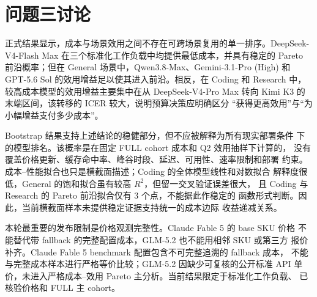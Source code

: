 \section{问题三讨论}

正式结果显示，成本与场景效用之间不存在可跨场景复用的单一排序。DeepSeek-
V4-Flash Max 在三个标准化工作负载中均提供最低成本，并具有稳定的
Pareto 前沿概率；但在 General 场景中，Qwen3.8-Max、Gemini-3.1-Pro
(High) 和 GPT-5.6 Sol 的效用增益足以使其进入前沿。相反，在 Coding 和
Research 中，较高成本模型的效用增益主要集中在从 DeepSeek-V4-Pro Max
转向 Kimi K3 的末端区间，该转移的 ICER 较大，说明预算决策应明确区分
“获得更高效用”与“为小幅增益支付多少成本”。

Bootstrap 结果支持上述结论的稳健部分，但不应被解释为所有现实部署条件
下的模型排名。该概率是在固定 FULL cohort 成本和 Q2 效用抽样下计算的，
没有覆盖价格更新、缓存命中率、峰谷时段、延迟、可用性、速率限制和部署
约束。成本--性能拟合也只是横截面描述；Coding 的全体模型线性和对数拟合
解释度很低，General 的饱和拟合虽有较高 $R^2$，但留一交叉验证误差很大，
且 Coding 与 Research 的 Pareto 前沿拟合仅有 3 个点，不能据此作稳定的
函数形式判断。因此，当前横截面样本未提供稳定证据支持统一的成本边际
收益递减关系。

本轮最重要的发布限制是价格观测完整性。Claude Fable 5 的 base SKU 价格
不能替代带 fallback 的完整配置成本，GLM-5.2 也不能用相邻 SKU 或第三方
报价补齐。Claude Fable 5 benchmark 配置包含不可完整追溯的 fallback 成本，
不能与完整成本样本进行严格等价比较；GLM-5.2 因缺少可复核的公开标准 API
单价，未进入严格成本--效用 Pareto 主分析。当前结果限定于标准化工作负载、
已核验价格和 FULL 主 cohort。
